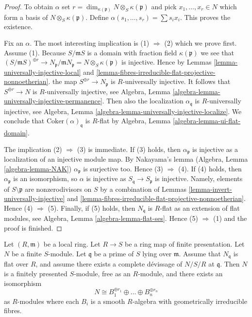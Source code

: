 \begin{proof}
To obtain $\alpha$ set
$r = \dim_{\kappa(\mathfrak p)} N \otimes_S \kappa(\mathfrak p)$ and pick
$x_1, \ldots, x_r \in N$ which form a basis of
$N \otimes_S \kappa(\mathfrak p)$. Define
$\alpha(s_1, \ldots, s_r) = \sum s_i x_i$. This proves the existence.

\medskip\noindent
Fix an $\alpha$. The most interesting implication is
(1) $\Rightarrow$ (2) which we prove first. Assume (1).
Because $S/\mathfrak mS$ is a domain with fraction field $\kappa(\mathfrak p)$
we see that
$(S/\mathfrak mS)^{\oplus r} \to
N_{\mathfrak p}/\mathfrak mN_{\mathfrak p} = N \otimes_S \kappa(\mathfrak p)$
is injective. Hence by
Lemmas \ref{lemma-universally-injective-local} and
\ref{lemma-fibres-irreducible-flat-projective-nonnoetherian}.
the map $S^{\oplus r} \to N_{\mathfrak p}$ is $R$-universally injective.
It follows that $S^{\oplus r} \to N$ is $R$-universally injective, see
Algebra, Lemma \ref{algebra-lemma-universally-injective-permanence}.
Then also the localization $\alpha_{\mathfrak q}$ is $R$-universally
injective, see
Algebra, Lemma \ref{algebra-lemma-universally-injective-localize}.
We conclude that $\text{Coker}(\alpha)_{\mathfrak q}$ is $R$-flat by
Algebra, Lemma \ref{algebra-lemma-ui-flat-domain}.

\medskip\noindent
The implication (2) $\Rightarrow$ (3) is immediate. If (3) holds, then
$\alpha_{\mathfrak p}$ is injective as a localization of an injective
module map. By Nakayama's lemma
(Algebra, Lemma \ref{algebra-lemma-NAK})
$\alpha_{\mathfrak p}$ is surjective too. Hence (3) $\Rightarrow$ (4).
If (4) holds, then $\alpha_{\mathfrak p}$ is an isomorphism, so
$\alpha$ is injective as $S_{\mathfrak q} \to S_{\mathfrak p}$ is injective.
Namely, elements of $S \setminus \mathfrak p$ are nonzerodivisors on $S$
by a combination of
Lemmas \ref{lemma-invert-universally-injective} and
\ref{lemma-fibres-irreducible-flat-projective-nonnoetherian}.
Hence (4) $\Rightarrow$ (5). Finally, if (5) holds, then
$N_{\mathfrak q}$ is $R$-flat as an extension of flat modules, see
Algebra, Lemma \ref{algebra-lemma-flat-ses}.
Hence (5) $\Rightarrow$ (1) and the proof is finished.
\end{proof}

\begin{lemma}
\label{lemma-complete-devissage-flat-finite-type-module}
Let $(R, \mathfrak m)$ be a local ring.
Let $R \to S$ be a ring map of finite presentation.
Let $N$ be a finite $S$-module.
Let $\mathfrak q$ be a prime of $S$ lying over $\mathfrak m$.
Assume that $N_{\mathfrak q}$ is flat over $R$, and
assume there exists a complete d\'evissage of $N/S/R$ at $\mathfrak q$.
Then $N$ is a finitely presented $S$-module, free as an $R$-module,
and there exists an isomorphism
$$
N \cong B_1^{\oplus r_1} \oplus \ldots \oplus B_n^{\oplus r_n}
$$
as $R$-modules where each $B_i$ is a smooth $R$-algebra with geometrically
irreducible fibres.
\end{lemma}

